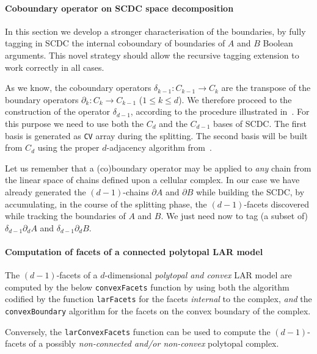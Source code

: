 \documentclass[11pt,oneside]{article}	%
\begin{document}
\paragraph{Coboundary operator on SCDC space decomposition}

In this section we develop a stronger characterisation of the boundaries, by fully tagging in SCDC the internal coboundary of boundaries of $A$ and $B$ Boolean arguments. This novel strategy should allow the recursive tagging extension to work correctly in all cases.

As we know, the  coboundary operators $\delta_{k-1}: C_{k-1} \to C_k$ are the transpose of the boundary operators $\partial_k: C_k \to C_{k-1}$ ($1\leq k\leq d$). We therefore proceed to the construction of the operator $\delta_{d-1}$, according to the procedure illustrated in~\cite{}. For this purpose we need to use both the $C_d$ and the $C_{d-1}$ bases of SCDC. The first basis is generated as \texttt{CV} array during the splitting. The second basis will be built from $C_d$ using the proper $d$-adjacency algorithm from~\cite{}. 

Let us remember that a (co)boundary operator may be applied to \emph{any} chain from the linear space of chains defined upon a cellular complex. 
In our case we have already generated the $(d-1)$-chains $\partial A$ and $\partial B$ while building the SCDC, by accumulating, in the course of the splitting phase, the $(d-1)$-facets discovered while tracking the boundaries of $A$ and $B$. We just need now to tag (a subset of) $\delta_{d-1}\partial_d A$ and $\delta_{d-1}\partial_d B$.


\paragraph{Computation of facets of a connected polytopal LAR model}

The $(d-1)$-facets of a $d$-dimensional \emph{polytopal and convex} LAR model are computed by the below \texttt{convexFacets} function by using both the algorithm codified by the function \texttt{larFacets} for the facets \emph{internal} to the complex, \emph{and} the \texttt{convexBoundary} algorithm for the facets on the convex boundary of the complex.

Conversely, the \texttt{larConvexFacets} function can be used to compute the $(d-1)$-facets of a possibly \emph{non-connected and/or non-convex} polytopal complex.
\end{document}
